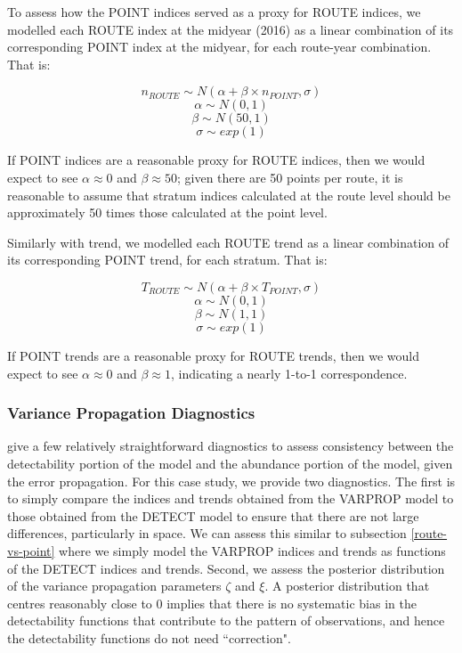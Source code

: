 \par To assess how the POINT indices served as a proxy for ROUTE indices, we modelled each ROUTE index at the midyear (2016) as a linear combination of its corresponding POINT index at the midyear, for each route-year combination. 
That is:

$$	n_{ROUTE} \sim N(\alpha + \beta \times n_{POINT}, \sigma) $$
$$	\alpha \sim N(0,1) $$
$$	\beta \sim N(50, 1) $$
$$	\sigma \sim exp(1)$$

If POINT indices are a reasonable proxy for ROUTE indices, then we would expect to see $\alpha \approx 0$ and $\beta \approx 50$; given there are 50 points per route, it is reasonable to assume that stratum indices calculated at the route level should be approximately 50 times those calculated at the point level.

\par Similarly with trend, we modelled each ROUTE trend as a linear combination of its corresponding POINT trend, for each stratum.
That is:

$$ T_{ROUTE} \sim N(\alpha + \beta \times T_{POINT}, \sigma)$$
$$ \alpha \sim N(0,1) $$
$$ \beta \sim N(1,1) $$
$$ \sigma \sim exp(1) $$

If POINT trends are a reasonable proxy for ROUTE trends, then we would expect to see $\alpha \approx 0$ and $\beta \approx 1$, indicating a nearly 1-to-1 correspondence. 

\subsubsection{Variance Propagation Diagnostics}

\par \citet{bravington_variance_2021} give a few relatively straightforward diagnostics to assess consistency between the detectability portion of the model and the abundance portion of the model, given the error propagation.
For this case study, we provide two diagnostics.
The first is to simply compare the indices and trends obtained from the VARPROP model to those obtained from the DETECT model to ensure that there are not large differences, particularly in space. 
We can assess this similar to subsection \ref{route-vs-point} where we simply model the VARPROP indices and trends as functions of the DETECT indices and trends.
Second, we assess the posterior distribution of the variance propagation parameters $\zeta$ and $\xi$.
A posterior distribution that centres reasonably close to 0 implies that there is no systematic bias in the detectability functions that contribute to the pattern of observations, and hence the detectability functions do not need ``correction".

